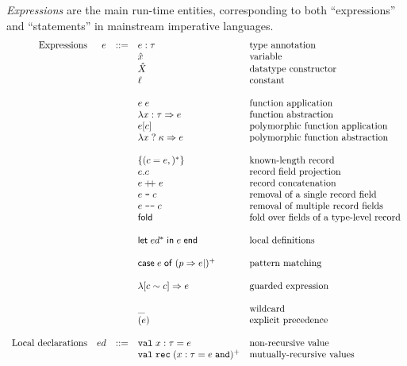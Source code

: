 \documentclass{article}
\newcommand{\cd}[1]{\texttt{#1}}
\newcommand{\mt}[1]{\mathsf{#1}}
\newcommand{\rc}{+ \hspace{-.075in} + \;}
\newcommand{\rcut}{\; \texttt{--} \;}
\newcommand{\rcutM}{\; \texttt{---} \;}
\begin{document}
\emph{Expressions} are the main run-time entities, corresponding to both ``expressions'' and ``statements'' in mainstream imperative languages.
$$\begin{array}{rrcll}
  \textrm{Expressions} & e &::=& e : \tau & \textrm{type annotation} \\
  &&& \hat{x} & \textrm{variable} \\
  &&& \hat{X} & \textrm{datatype constructor} \\
  &&& \ell & \textrm{constant} \\
  \\
  &&& e \; e & \textrm{function application} \\
  &&& \lambda x : \tau \Rightarrow e & \textrm{function abstraction} \\
  &&& e [c] & \textrm{polymorphic function application} \\
  &&& \lambda x \; ? \; \kappa \Rightarrow e & \textrm{polymorphic function abstraction} \\
  \\
  &&& \{(c = e,)^*\} & \textrm{known-length record} \\
  &&& e.c & \textrm{record field projection} \\
  &&& e \rc e & \textrm{record concatenation} \\
  &&& e \rcut c & \textrm{removal of a single record field} \\
  &&& e \rcutM c & \textrm{removal of multiple record fields} \\
  &&& \mt{fold} & \textrm{fold over fields of a type-level record} \\
  \\
  &&& \mt{let} \; ed^* \; \mt{in} \; e \; \mt{end} & \textrm{local definitions} \\
  \\
  &&& \mt{case} \; e \; \mt{of} \; (p \Rightarrow e|)^+ & \textrm{pattern matching} \\
  \\
  &&& \lambda [c \sim c] \Rightarrow e & \textrm{guarded expression} \\
  \\
  &&& \_ & \textrm{wildcard} \\
  &&& (e) & \textrm{explicit precedence} \\
  \\
  \textrm{Local declarations} & ed &::=& \cd{val} \; x : \tau = e & \textrm{non-recursive value} \\
  &&& \cd{val} \; \cd{rec} \; (x : \tau = e \; \cd{and})^+ & \textrm{mutually-recursive values} \\
\end{array}$$
\end{document}
